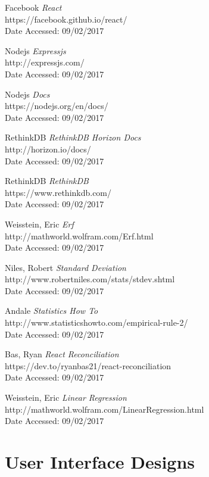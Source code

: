 \documentclass[11pt, oneside, a4paper]{article}
\begin{document}
\newpage
\begin{thebibliography}

	\item Facebook {\em React} \\
	https://facebook.github.io/react/ \\
	Date Accessed: 09/02/2017
	\item Nodejs {\em Expressjs} \\
	http://expressjs.com/ \\
	Date Accessed: 09/02/2017
	\item Nodejs {\em Docs} \\
	https://nodejs.org/en/docs/ \\
	Date Accessed: 09/02/2017
	\item RethinkDB {\em RethinkDB Horizon Docs} \\
	http://horizon.io/docs/ \\
	Date Accessed: 09/02/2017
	\item RethinkDB {\em RethinkDB} \\
	https://www.rethinkdb.com/ \\
	Date Accessed: 09/02/2017
	\item Weisstein, Eric {\em Erf} \\
 	http://mathworld.wolfram.com/Erf.html\\
	Date Accessed: 09/02/2017
	\item Niles, Robert {\em Standard Deviation} \\
	http://www.robertniles.com/stats/stdev.shtml \\
	Date Accessed: 09/02/2017
	\item Andale {\em Statistics How To} \\
	http://www.statisticshowto.com/empirical-rule-2/ \\
	Date Accessed: 09/02/2017
	\item Bas, Ryan {\em React Reconciliation} \\
	https://dev.to/ryanbas21/react-reconciliation \\
	Date Accessed: 09/02/2017
	\item Weisstein, Eric {\em Linear Regression} \\
	http://mathworld.wolfram.com/LinearRegression.html \\
	Date Accessed: 09/02/2017
\end{thebibliography}

\newpage
\appendix
\section{User Interface Designs}
\end{document}
